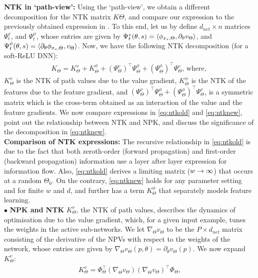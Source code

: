 \textbf{NTK in `path-view':} Using the `path-view', we obtain a different decomposition for the NTK matrix $K{\Theta}$, and compare our expression to the previously obtained expression in . To this end, let us by define $d_{net}\times n$ matrices $\Psi^v_t$, and $\Psi^{\phi}_t$, whose entries are given by $\Psi^v_t(\theta,s)=\langle \phi_{x_s,\Theta},\partial_{\theta}v_{\Theta}\rangle$, and  $\Psi^{\phi}_t(\theta,s)=\langle \partial_{\theta}\phi_{x_s,\Theta}, v_{\Theta}\rangle$. Now, we have the following NTK decomposition (for a soft-ReLU DNN):
\begin{align}\label{eq:ntknew}
K_{\Theta}=K^v_{\Theta}+K^{\phi}_{\Theta}+(\Psi^v_\Theta)^\top \Psi^{\phi}_{\Theta} +(\Psi^{\phi}_\Theta)^\top \Psi^{v}_{\Theta},\,\text{where},
\end{align}
$K^v_{\Theta}$ is the NTK of path values due to the value gradient, $K^{\phi}_{\Theta}$ is the NTK of the features due to the feature gradient, and $(\Psi^v_\Theta)^\top \Psi^{\phi}_{\Theta} +(\Psi^{\phi}_\Theta)^\top \Psi^{v}_{\Theta}$, is a symmetric matrix which is the cross-term obtained as an interaction of the value and the feature gradients. We now compare expressions in \eqref{eq:ntkold} and \eqref{eq:ntknew},  point out the relationship between NTK and NPK, and discuss the significance of the decomposition in \eqref{eq:ntknew}.\\
\textbf{Comparison of NTK expressions:} The recursive relationship in \eqref{eq:ntkold} is due to the fact that both zeroth-order (forward propagation) and first-order (backward propagation) information use a layer after layer expression for information flow. Also, \eqref{eq:ntkold} derives a limiting matrix ($w\rightarrow\infty$) that occurs at a random $\Theta_0$. On the contrary, \eqref{eq:ntknew} holds for any parameter setting and for finite $w$ and $d$, and further has a term $K^{\phi}_{\Theta}$ that separately models feature learning.\\
 $\bullet$ \textbf{NPK and NTK} $K^v_{\Theta}$, the NTK of path values, describes the dynamics of optimisation due to the value gradient, which, for a given input example, tunes the weights in the active sub-networks. We let $\nabla_{\Theta}v_{\Theta}$ to be the $P\times d_{net}$ matrix consisting of the derivative of the NPVs with respect to the weights of the network, whose entries are given by $\nabla_{\Theta}v_{\Theta}(p,\theta)=\partial_{\theta}v_{\Theta}(p)$. We now expand $K^v_{\Theta}$:
\begin{align}\
K^{v}_{\Theta}=\Phi^\top_{\Theta}(\nabla_{\Theta} v_{\Theta})(\nabla_{\Theta} v_{\Theta})^\top \Phi_{\Theta},
\end{align}
